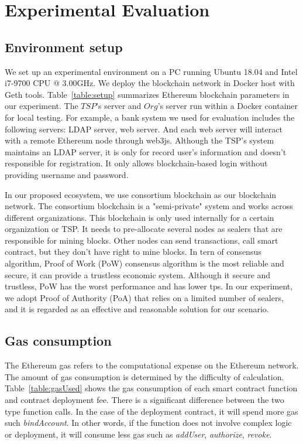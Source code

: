 \chapter{Experimental Evaluation}
\label{chapter:evaluation}


\section{Environment setup}

We set up an experimental environment on a PC running Ubuntu 18.04 and Intel i7-9700 CPU @ 3.00GHz. We deploy the blockchain network in Docker host with Geth tools. Table~\ref{table:setup} summarizes Ethereum blockchain parameters in our experiment. The \(TSP\)'s server and \(Org\)'s server run within a Docker container for local testing. For example, a bank system we used for evaluation includes the following servers: LDAP server, web server. And each web server will interact with a remote Ethereum node through web3js. Although the TSP's system maintains an LDAP server, it is only for record user's information and doesn't responsible for registration. It only allows blockchain-based login without providing username and password. \par
In our proposed ecosystem, we use consortium blockchain as our blockchain network. The consortium blockchain is a "semi-private" system and works across different organizations. This blockchain is only used internally for a certain organization or TSP. It needs to pre-allocate several nodes as sealers that are responsible for mining blocks. Other nodes can send transactions, call smart contract, but they don't have right to mine blocks. In tern of consensus algorithm, Proof of Work (PoW) consensus algorithm is the most reliable and secure, it can provide a trustless economic system. Although it secure and trustless, PoW has the worst performance and has lower tps. In our experiment, we adopt Proof of Authority (PoA) that relies on a limited number of sealers, and it is regarded as an effective and reasonable solution for our scenario.
\section{Gas consumption}

The Ethereum gas refers to the computational expense on the Ethereum network. The amount of gas consumption is determined by the difficulty of calculation. Table~\ref{table:gasUsed} shows the gas consumption of each smart contract function and contract deployment fee. There is a significant difference between the two type function calls. In the case of the deployment contract, it will spend more gas such \textit{bindAccount}. In other words, if the function does not involve complex logic or deployment, it will consume less gas such as \textit{addUser}, \textit{authorize}, \textit{revoke}.

